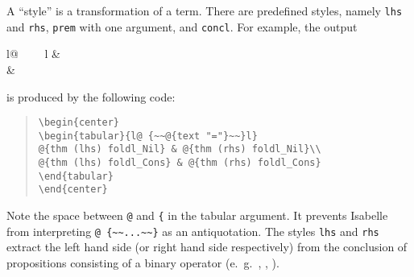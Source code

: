 \begin{isabellebody}
\begin{isamarkuptext}
  A ``style'' is a transformation of a term. There are predefined
  styles, namely \verb!lhs! and \verb!rhs!, \verb!prem! with one argument, and \verb!concl!.
  For example, 
  the output
  \begin{center}
  \begin{tabular}{l@ {~~~~}l}
   & \\
   & 
  \end{tabular}
  \end{center}
  is produced by the following code:
  \begin{quote}
    \verb!\begin{center}!\\
    \verb!\begin{tabular}{l@ {~~!\verb!@!\verb!{text "="}~~}l}!\\
    \verb!@!\verb!{thm (lhs) foldl_Nil} & @!\verb!{thm (rhs) foldl_Nil}\\!\\
    \verb!@!\verb!{thm (lhs) foldl_Cons} & @!\verb!{thm (rhs) foldl_Cons}!\\
    \verb!\end{tabular}!\\
    \verb!\end{center}!
  \end{quote}
  Note the space between \verb!@! and \verb!{! in the tabular argument.
  It prevents Isabelle from interpreting \verb!@ {~~...~~}! 
  as an antiquotation. The styles \verb!lhs! and \verb!rhs!
  extract the left hand side (or right hand side respectively) from the
  conclusion of propositions consisting of a binary operator
  (e.~g.~, , ).


\end{isamarkuptext}
\end{isabellebody}
